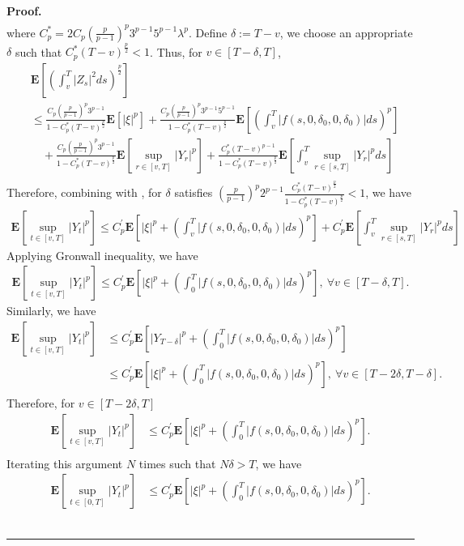 \documentclass[10pt]{article}%
\numberwithin{equation}{section}
\newenvironment{proof}[1][Proof]{\noindent \textbf{#1.} }{\  \rule{0.5em}{0.5em}}
\begin{document}
\begin{proof}
\begin{align*}
\end{align*}
where $C_{p}^{*}=2C_p\left(\frac{p}{p-1}\right)^p3^{p-1}5^{p-1}\lambda^p$.
Define $\delta:=T-v$, we choose an appropriate $\delta$ such that $C_{p}^{*}(T-v)^{\frac{p}{2}}<1$. Thus, for $v\in[T-\delta,T]$,
\begin{align*}
&\mathbf{E}\left[\left(\int_{v}^{T}|Z_s|^2ds\right)^{\frac{p}{2}}\right]\\
&\leq \frac{C_p\left(\frac{p}{p-1}\right)^p3^{p-1}}{1-C_{p}^{*}(T-v)^{\frac{p}{2}}}\mathbf{E}\left[\left|\xi\right|^p\right]+ \frac{C_p\left(\frac{p}{p-1}\right)^p3^{p-1}5^{p-1}}{1-C_{p}^{*}(T-v)^{\frac{p}{2}}}\mathbf{E}\left[\left(\int_{v}^{T}\left|f(s,0, \delta_0,0,\delta_0)\right|ds\right)^p\right]\\
&\quad + \frac{C_p\left(\frac{p}{p-1}\right)^p3^{p-1}}{1-C_{p}^{*}(T-v)^{\frac{p}{2}}}\mathbf{E}\left[\sup_{r\in[v,T]}\left|Y_r\right|^p\right] + \frac{C_{p}^{*}(T-v)^{p-1}}{1-C_{p}^{*}(T-v)^{\frac{p}{2}}}\mathbf{E}\left[\int_{v}^{T}\sup_{r\in[s,T]}|Y_r|^pds\right]\\   
\end{align*}
Therefore, combining with , for $\delta$ satisfies $(\frac{p}{p-1})^p2^{p-1}\frac{C_{p}^{*}(T-v)^{\frac{p}{2}}}{1-C_{p}^{*}(T-v)^{\frac{p}{2}}}<1$, we have 
\begin{align*}
\mathbf{E}\left[\sup_{t\in[v,T]}\left|Y_t\right|^p\right]\leq C_p^{'}\mathbf{E}\left[\left|\xi\right|^p+\left(\int_{v}^{T}\left|f(s,0,\delta_0,0,\delta_0)\right|ds\right)^p\right]+C_p^{'}\mathbf{E}\left[\int_{v}^{T}\sup_{r\in[s,T]}\left|Y_r\right|^pds\right]
\end{align*}
Applying Gronwall inequality, we have 
\begin{align*}
\mathbf{E}\left[\sup_{t\in[v,T]}\left|Y_t\right|^p\right]\leq C_p^{'}\mathbf{E}\left[\left|\xi\right|^p+\left(\int_{0}^{T}\left|f(s,0,\delta_0,0,\delta_0)\right|ds\right)^p\right], \ \forall v\in[T-\delta,T].
\end{align*}
Similarly, we have 
\begin{align*}
\mathbf{E}\left[\sup_{t\in[v,T]}\left|Y_t\right|^p\right]&
\leq C_p^{'}\mathbf{E}\left[\left|Y_{T-\delta}\right|^p+\left(\int_{0}^{T}\left|f(s,0,\delta_0,0,\delta_0)\right|ds\right)^p\right]\\
&\leq C_p^{'}\mathbf{E}\left[\left|\xi\right|^p+\left(\int_{0}^{T}\left|f(s,0,\delta_0,0,\delta_0)\right|ds\right)^p\right], \ \forall v\in[T-2\delta,T-\delta].\\
\end{align*}
Therefore, for $v\in[T-2\delta,T]$
\begin{align*}
\mathbf{E}\left[\sup_{t\in[v,T]}\left|Y_t\right|^p\right]
&\leq C_p^{'}\mathbf{E}\left[\left|\xi\right|^p+\left(\int_{0}^{T}\left|f(s,0,\delta_0,0,\delta_0)\right|ds\right)^p\right].\\
\end{align*}
Iterating this argument $N$ times such that $N\delta>T$, we have 
\begin{align*}
\mathbf{E}\left[\sup_{t\in[0,T]}\left|Y_t\right|^p\right]
&\leq C_p^{'}\mathbf{E}\left[\left|\xi\right|^p+\left(\int_{0}^{T}\left|f(s,0,\delta_0,0,\delta_0)\right|ds\right)^p\right].
\end{align*}
\end{proof}
\end{document}
